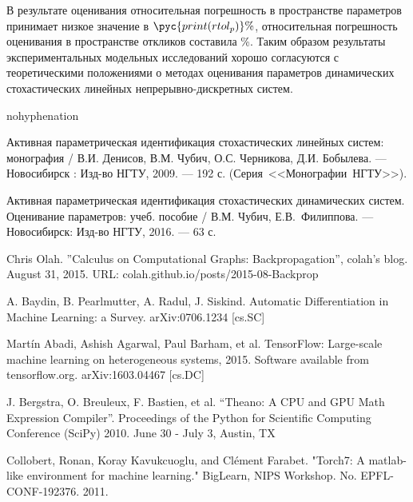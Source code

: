 \documentclass[a4paper,14pt]{extarticle}
\begin{document}
В результате оценивания относительная погрешность в пространстве параметров
принимает низкое значение в $\pyc{print(rtol_p)}\%$, относительная погрешность
оценивания в пространстве откликов составила \%. Таким
образом результаты экспериментальных модельных исследований хорошо согласуются
с теоретическими положениями о методах оценивания параметров динамических
стохастических линейных непрерывно-дискретных систем.

\begin{thebibliography}{9}

\begin{hyphenrules}{nohyphenation} 


\begin{sloppypar}

 Активная параметрическая идентификация стохастических
линейных систем: монография / В.И. Денисов, В.М. Чубич, О.С. Черникова, Д.И.
	Бобылева. --- Новосибирск : Изд-во НГТУ, 2009. --- 192 с.
	\mbox{(Серия <<Монографии НГТУ>>)}.

 Активная параметрическая идентификация стохастических
	динамических систем. Оценивание параметров: учеб. пособие / В.М. Чубич,
	\mbox{Е.В. Филиппова}. --- Новосибирск: Изд-во НГТУ, 2016. --- 63 с.

 Chris Olah. ''Calculus on Computational Graphs:
Backpropagation'', colah's blog. August 31, 2015.
URL: colah.github.io/posts/2015-08-Backprop

 A. Baydin, B. Pearlmutter, A. Radul, J. Siskind.
Automatic Differentiation in Machine Learning: a Survey. {arXiv:0706.1234 [cs.SC]}

 Martín Abadi, Ashish Agarwal, Paul Barham, et al.
TensorFlow: Large-scale machine learning on heterogeneous systems,
2015. Software available from tensorflow.org. {arXiv:1603.04467 [cs.DC]}

 J. Bergstra, O. Breuleux, F. Bastien, et al. “Theano: A CPU
and GPU Math Expression Compiler”. Proceedings of the Python for Scientific
Computing Conference (SciPy) 2010. June 30 - July 3, Austin, TX

 Collobert, Ronan, Koray Kavukcuoglu, and Clément Farabet.
"Torch7: A matlab-like environment for machine learning." BigLearn, NIPS
Workshop. No. EPFL-CONF-192376. 2011.

\end{sloppypar}

\end{hyphenrules}

\end{thebibliography}
\end{document}

